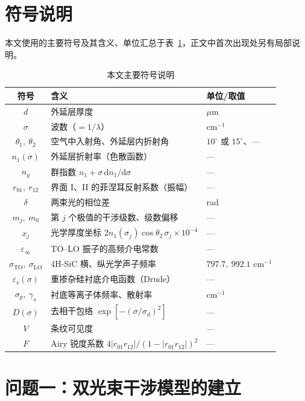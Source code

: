 \documentclass[11pt,a4paper,fontset=fandol]{ctexart}
\begin{document}
\section{符号说明}

本文使用的主要符号及其含义、单位汇总于表~\ref{tab:symbols}，正文中首次出现处另有局部说明。
\begin{table}[!htb]
    \centering
    \caption{本文主要符号说明}
    \label{tab:symbols}
    \small
    \begin{tabular}{cll}
        \toprule
        符号 & 含义 & 单位/取值 \\
        \midrule
        $d$ & 外延层厚度 & $\mu$m \\
        $\sigma$ & 波数（$=1/\lambda$） & cm$^{-1}$ \\
        $\theta_1,\ \theta_2$ & 空气中入射角、外延层内折射角 & $10^\circ$ 或 $15^\circ$、— \\
        $n_1(\sigma)$ & 外延层折射率（色散函数） & — \\
        $n_g$ & 群指数 $n_1+\sigma\,\mathrm{d}n_1/\mathrm{d}\sigma$ & — \\
        $r_{01},\ r_{12}$ & 界面 I、II 的菲涅耳反射系数（振幅） & — \\
        $\delta$ & 两束光的相位差 & rad \\
        $m_j,\ m_0$ & 第 $j$ 个极值的干涉级数、级数偏移 & — \\
        $x_j$ & 光学厚度坐标 $2n_1(\sigma_j)\cos\theta_2\,\sigma_j\times10^{-4}$ & — \\
        $\varepsilon_\infty$ & TO--LO 振子的高频介电常数 & — \\
        $\sigma_{\mathrm{TO}},\ \sigma_{\mathrm{LO}}$ & 4H-SiC 横、纵光学声子频率 & $797.7,\ 992.1$ cm$^{-1}$ \\
        $\varepsilon_s(\sigma)$ & 重掺杂硅衬底介电函数（Drude） & — \\
        $\sigma_p,\ \gamma_s$ & 衬底等离子体频率、散射率 & cm$^{-1}$ \\
        $D(\sigma)$ & 去相干包络 $\exp[-(\sigma/\sigma_d)^2]$ & — \\
        $V$ & 条纹可见度 & — \\
        $F$ & Airy 锐度系数 $4|r_{01}r_{12}|/(1-|r_{01}r_{12}|)^2$ & — \\
        \bottomrule
    \end{tabular}
\end{table}

\section{问题一：双光束干涉模型的建立}\label{sec:q1}
\end{document}
